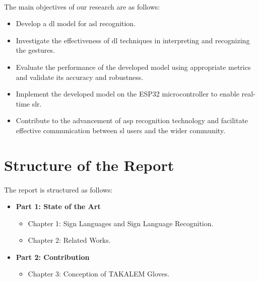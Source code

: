 \paragraph{}
The main objectives of our research are as follows:
\begin{itemize}
	\item Develop a \ac{dl} model for \ac{asl} recognition.
	\item Investigate the effectiveness of \ac{dl} techniques in interpreting and recognizing the gestures.
	\item Evaluate the performance of the developed model using appropriate metrics and validate its accuracy and robustness.
	\item Implement the developed model on the ESP32 microcontroller to enable real-time \ac{slr}.
	\item Contribute to the advancement of \ac{asp} recognition technology and facilitate effective communication between \ac{sl} users and the wider community.
\end{itemize}

\section{Structure of the Report}
\paragraph{}
The report is structured as follows:

\begin{itemize}
	\item \textbf{Part 1: State of the Art}
	\begin{itemize}
		\item Chapter 1: Sign Languages and Sign Language Recognition.
		\item Chapter 2: Related Works.
	\end{itemize}
	
	\item \textbf{Part 2: Contribution}
	\begin{itemize}
		\item Chapter 3: Conception of TAKALEM Gloves.
	\end{itemize}
\end{itemize}
